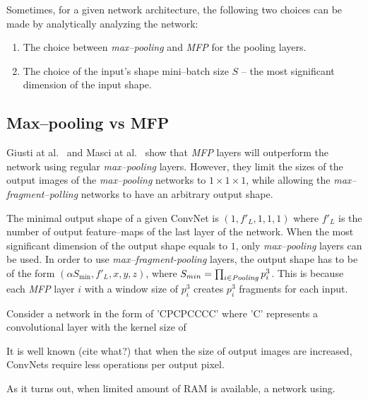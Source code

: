 \documentclass[conference]{IEEEtran}
\begin{document}
  Sometimes, for a given network architecture, the following two
  choices can be made by analytically analyzing the network:

  \begin{enumerate}
    \item The choice between \emph{max--pooling} and \emph{MFP} for
      the pooling layers.
    \item The choice of the input's shape mini--batch size $S$ -- the
      most significant dimension of the input shape.
  \end{enumerate}

\subsection{Max--pooling vs MFP}

  Giusti at al.~\cite{giusti2013fast} and Masci at
  al.~\cite{masci2013fast} show that \emph{MFP}
  layers will outperform the network using regular \emph{max--pooling}
  layers.  However, they limit the sizes of the output images of the
  \emph{max--pooling} networks to $1 \times 1 \times 1$, while
  allowing the \emph{max--fragment--polling} networks to have an
  arbitrary output shape.

  The minimal output shape of a given ConvNet is $(1,f'_L,1,1,1)$
  where $f'_L$ is the number of output feature--maps of the last layer
  of the network.  When the most significant dimension of the output
  shape equals to $1$, only \emph{max--pooling} layers can be used.
  In order to use \emph{max--fragment-pooling} layers, the output
  shape has to be of the form $(\alpha S_{\min},f'_L,x,y,z)$, where
  $S_{min} = \prod_{i \in \id{Pooling}} p^3_i$.  This is because each
  \emph{MFP} layer $i$ with a window size of
  $p_i^3$ creates $p_i^3$ fragments for each input.

  Consider a network in the form of 'CPCPCCCC' where 'C' represents a
  convolutional layer with the kernel size of

  It is well known (cite what?) that when the size of output images
  are increased, ConvNets require less operations per output pixel.

  As it turns out, when limited amount of RAM is available, a network
  using.
\end{document}
